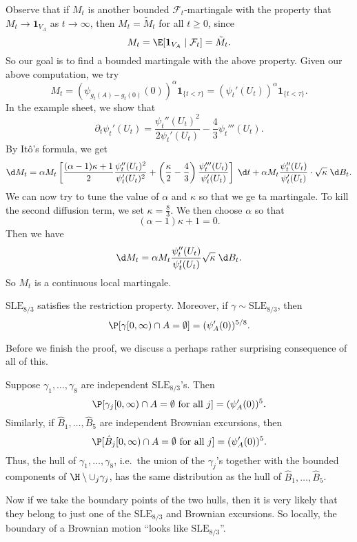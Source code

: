 \documentclass[a4paper]{article}
\newcommand\SLE{\mathrm{SLE}}
\begin{document}
Observe that if $M_t$ is another bounded $\mathcal{F}_t$-martingale with the property that $M_t \to \mathbf{1}_{V_A}$ as $t \to \infty$, then $M_t = \tilde{M}_t$ for all $t \geq 0$, since
\[
  M_t = \E[\mathbf{1}_{V_A} \mid \mathcal{F}_t] = \tilde{M}_t.
\]
So our goal is to find a bounded martingale with the above property. Given our above computation, we try
\[
  M_t = (\psi_{g_t(A) - g_t(0)}(0))^\alpha \mathbf{1}_{\{t < \tau\}} = (\psi_t'(U_t))^\alpha \mathbf{1}_{\{t < \tau\}}.
\]
In the example sheet, we show that
\[
  \partial_t \psi_t' (U_t) = \frac{\psi_t''(U_t)^2}{2\psi_t'(U_t)} - \frac{4}{3} \psi_t'''(U_t).
\]
By It\^o's formula, we get
\[
  \d M_t = \alpha M_t \left[\frac{(\alpha - 1)\kappa + 1}{2} \frac{\psi_t''(U_t)^2}{\psi_t'(U_t)^2} + \left(\frac{\kappa}{2} - \frac{4}{3}\right) \frac{\psi_t'''(U_t)}{\psi_t'(U_t)}\right]\;\d t + \alpha M_t \frac{\psi_t''(U_t)}{\psi_t'(U_t)} \cdot \sqrt{\kappa} \;\d B_t.
\]
We can now try to tune the value of $\alpha$ and $\kappa$ so that we ge ta martingale. To kill the second diffusion term, we set $\kappa = \frac{8}{3}$. We then choose $\alpha$ so that
\[
  (\alpha - 1) \kappa + 1 = 0.
\]
Then we have
\[
  \d M_t = \alpha M_t \frac{\psi_t''(U_t)}{\psi_t'(U_t)}\sqrt{\kappa} \;\d B_t.
\]
So $M_t$ is a continuous local martingale.
\begin{thm}
  $\SLE_{8/3}$ satisfies the restriction property. Moreover, if $\gamma \sim \SLE_{8/3}$, then
  \[
    \P[\gamma[0, \infty) \cap A = \emptyset] = (\psi_A'(0))^{5/8}.
  \]
\end{thm}
Before we finish the proof, we discuss a perhaps rather surprising consequence of all of this.

Suppose $\gamma_1, \ldots, \gamma_8$ are independent $\SLE_{8/3}$'s. Then
\[
  \P[\gamma_j[0, \infty) \cap A = \emptyset\text{ for all }j] = (\psi_A'(0))^5.
\]
Similarly, if $\hat{B}_1, \ldots, \hat{B}_5$ are independent Brownian excursions, then
\[
  \P[\hat{B}_j[0, \infty) \cap A = \emptyset\text{ for all }j] = (\psi_A'(0))^5.
\]
Thus, the hull of $\gamma_1, \ldots, \gamma_8$, i.e.\ the union of the $\gamma_j$'s together with the bounded components of $\H \setminus \cup_j \gamma_j$, has the same distribution as the hull of $\hat{B}_1, \ldots, \hat{B}_5$.

Now if we take the boundary points of the two hulls, then it is very likely that they belong to just one of the $\SLE_{8/3}$ and Brownian excursions. So locally, the boundary of a Brownian motion ``looks like $\SLE_{8/3}$''.
\end{document}
